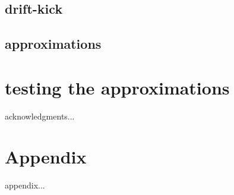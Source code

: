 \documentclass[preprint]{aastex62}
\begin{document}
\subsection{drift-kick}
\label{sec:drift-kick}


\subsection{approximations}
\label{subsec:approximations}

\section{testing the approximations}
\label{sec:testing}

\acknowledgments

acknowledgments...

\appendix

\section{Appendix}

appendix...


%

\end{document}
